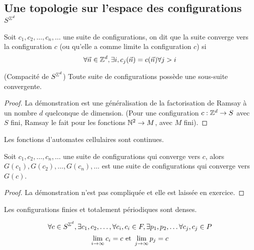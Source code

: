 \subsection{Une topologie sur l'espace des configurations $S^{\mathbb{Z}^d}$}


\begin{definition}
	Soit $c_1,c_2, \ldots, c_n, \ldots$ une suite de configurations, on dit que la suite converge vers
	la configuration $c$ (ou qu'elle a comme limite la configuration $c$) si
	$$ \forall \vec n \in \mathbb{Z}^d, \exists i, c_j(\vec n) = c(\vec n) \forall j > i$$
\end{definition}

\begin{prop}(Compacité de $S^{\mathbb{Z}^d}$)
	Toute suite de configurations possède une sous-suite convergente.
\end{prop}

\begin{proof}
	La démonstration est une généralisation de la factorisation de Ramsay à un nombre $d$ quelconque de dimension.
	(Pour une configuration $c : \mathbb{Z}^d \to S$ avec $S$ fini, Ramsay le fait pour les fonctions $\mathbb{N} ^ 2 \to M$, avec $M$ fini).
\end{proof}

\begin{prop}\label{prop:continues}
	Les fonctions d'automates cellulaires sont continues.

	Soit $c_1,c_2, \ldots, c_n, \ldots$ une suite de configurations qui converge vers $c$,
	alors $G(c_1),G(c_2), \ldots, G(c_n), \ldots$ est une suite de configurations qui converge vers $G(c)$.
\end{prop}

\begin{proof}
	La démonstration n'est pas compliquée et elle est laissée en exercice.
\end{proof}

\begin{prop}\label{prop:dense}
	Les configurations finies et totalement périodiques sont denses.

	$$\forall c \in S^{\mathbb{Z}^d}, \exists c_1,c_2, \ldots,\forall c_i, c_i \in F, \exists p_1,p_2, \ldots \forall c_j, c_j \in P$$
	$$ \lim_{i \to \infty} c_i = c \text{ et } \lim_{j \to \infty} p_j = c $$
\end{prop}

